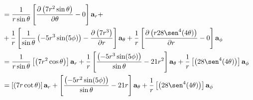 \begin{problema}
\begin{enumerate}
\begin{sol}
\begin{align*}
                        &= \frac{1}{r \sin \theta}\left[\frac{\partial\left(7r^2 \sin \theta\right)}{\partial \theta}-0\right] \mathbf{a}_r +\\
                        & +\frac{1}{r}\left[\frac{1}{\sin \theta}\left(-5r^3\sin(5\phi)\right)-\frac{\partial\left(7r^3\right)}{\partial r}\right] \mathbf{a}_\theta+\frac{1}{r}\left[\frac{\partial\left(r 28 \sen^4(4 \theta)\right)}{\partial r}-0\right] \mathbf{a}_\phi\\
                        &= \frac{1}{r \sin \theta}\left[\left(7r^2 \cos \theta\right)\right] \mathbf{a}_r +\frac{1}{r}\left[\frac{\left(-5r^3\sin(5\phi)\right)}{\sin \theta}-21r^2\right] \mathbf{a}_\theta+\frac{1}{r}\left[\left(28 \sen^4(4 \theta)\right)\right] \mathbf{a}_\phi\\
                        &= \left[\left(7r \cot \theta\right)\right] \mathbf{a}_r +\left[\frac{\left(-5r^2\sin(5\phi)\right)}{\sin \theta}-21r\right] \mathbf{a}_\theta+\frac{1}{r}\left[\left(28 \sen^4(4 \theta)\right)\right] \mathbf{a}_\phi
            \end{align*}
        \end{sol}
    \end{enumerate}

\end{problema}


